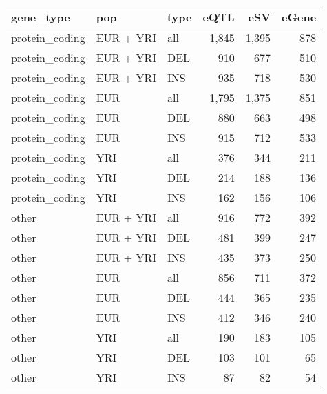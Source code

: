 
\begin{tabular}{l|l|l|r|r|r}
\hline
gene\_type & pop & type & eQTL & eSV & eGene\\
\hline
protein\_coding & EUR + YRI & all & 1,845 & 1,395 & 878\\
\hline
protein\_coding & EUR + YRI & DEL & 910 & 677 & 510\\
\hline
protein\_coding & EUR + YRI & INS & 935 & 718 & 530\\
\hline
protein\_coding & EUR & all & 1,795 & 1,375 & 851\\
\hline
protein\_coding & EUR & DEL & 880 & 663 & 498\\
\hline
protein\_coding & EUR & INS & 915 & 712 & 533\\
\hline
protein\_coding & YRI & all & 376 & 344 & 211\\
\hline
protein\_coding & YRI & DEL & 214 & 188 & 136\\
\hline
protein\_coding & YRI & INS & 162 & 156 & 106\\
\hline
other & EUR + YRI & all & 916 & 772 & 392\\
\hline
other & EUR + YRI & DEL & 481 & 399 & 247\\
\hline
other & EUR + YRI & INS & 435 & 373 & 250\\
\hline
other & EUR & all & 856 & 711 & 372\\
\hline
other & EUR & DEL & 444 & 365 & 235\\
\hline
other & EUR & INS & 412 & 346 & 240\\
\hline
other & YRI & all & 190 & 183 & 105\\
\hline
other & YRI & DEL & 103 & 101 & 65\\
\hline
other & YRI & INS & 87 & 82 & 54\\
\hline
\end{tabular}